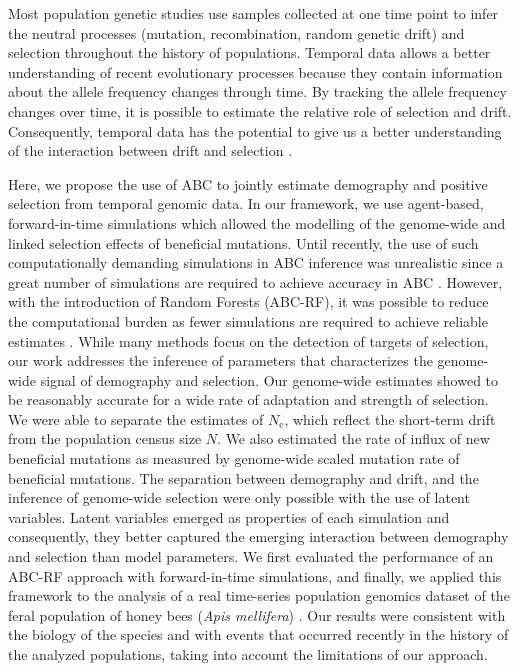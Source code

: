 \documentclass[a4paper, 12pt]{article}
\begin{document}
Most population genetic studies use samples collected at one time point to infer the neutral processes (mutation, recombination, random genetic drift) and selection throughout the history of populations. Temporal data allows a better understanding of recent evolutionary processes \citep{Feder:2021bt, Dehasque:2020ku} because they contain information about the allele frequency changes through time. By tracking the allele frequency changes over time, it is possible to estimate the relative role of selection and drift. Consequently, temporal data has the potential to give us a better understanding of the interaction between drift and selection \citep[see for example,][]{Buffalo:2019ab, Buffalo:2020hq}. 

Here, we propose the use of ABC to jointly estimate demography and positive selection from temporal genomic data. In our framework, we use agent-based, forward-in-time simulations which allowed the modelling of the genome-wide and linked selection effects of beneficial mutations. Until recently, the use of such computationally demanding simulations in ABC inference was unrealistic since a great number of simulations are required to achieve accuracy in ABC \citep{Frazier:2018kq}. However, with the introduction of Random Forests (ABC-RF), it was possible to reduce the computational burden as fewer simulations are required to achieve reliable estimates \citep{Pudlo:2016il, Raynal:2019jj}. While many methods focus on the detection of targets of selection, our work addresses the inference of parameters that characterizes the genome-wide signal of demography and selection. Our genome-wide estimates showed to be reasonably accurate for a wide rate of adaptation and strength of selection. We were able to separate the estimates of $N_{\mathrm{e}}$, which reflect the short-term drift from the population census size $N$. We also estimated the rate of influx of new beneficial mutations as measured by genome-wide scaled mutation rate of beneficial mutations. The separation between demography and drift, and the inference of genome-wide selection were only possible with the use of latent variables. Latent variables emerged as properties of each simulation and consequently, they better captured the emerging interaction between demography and selection than model parameters. We first evaluated the performance of an ABC-RF approach with forward-in-time simulations, and finally, we applied this framework to the analysis of a real time-series population genomics dataset of the feral population of honey bees (\textit{Apis mellifera}) \citep{Cridland:2018fx}. Our results were consistent with the biology of the species and with events that occurred recently in the history of the analyzed populations, taking into account the limitations of our approach.
\end{document}
